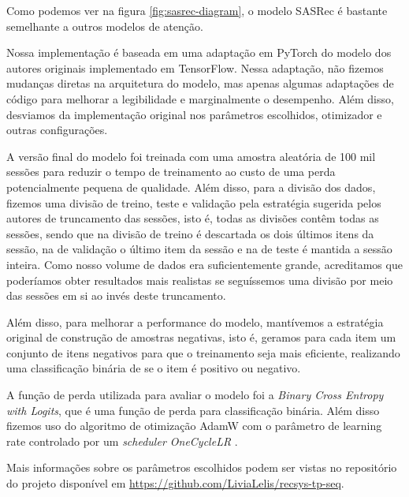 Como podemos ver na figura \ref{fig:sasrec-diagram}, o modelo SASRec
é bastante semelhante a outros modelos de atenção.

Nossa implementação é baseada em uma adaptação \cite{seanswyi} em
PyTorch do modelo dos autores originais implementado em TensorFlow.
Nessa adaptação, não fizemos mudanças diretas na arquitetura do
modelo, mas apenas algumas adaptações de código para melhorar a
legibilidade e marginalmente o desempenho. Além disso, desviamos
da implementação original nos parâmetros escolhidos, otimizador
e outras configurações.

A versão final do modelo foi treinada com uma amostra aleatória
de 100 mil sessões para reduzir o tempo de treinamento ao custo
de uma perda potencialmente pequena de qualidade. Além disso,
para a divisão dos dados, fizemos uma divisão de treino, teste
e validação pela estratégia sugerida pelos autores de truncamento
das sessões, isto é, todas as divisões contêm todas as sessões,
sendo que na divisão de treino é descartada os dois últimos itens
da sessão, na de validação o último item da sessão e na de teste
é mantida a sessão inteira. Como nosso volume de dados era
suficientemente grande, acreditamos que poderíamos obter resultados
mais realistas se seguíssemos uma divisão por meio das sessões em
si ao invés deste truncamento.

Além disso, para melhorar a performance do modelo, mantívemos a
estratégia original de construção de amostras negativas, isto é,
geramos para cada item um conjunto de itens negativos para que o
treinamento seja mais eficiente, realizando uma classificação
binária de se o item é positivo ou negativo.

A função de perda utilizada para avaliar o modelo foi a 
\textit{Binary Cross Entropy with Logits}, que é uma função de perda
para classificação binária. Além disso fizemos uso do algoritmo
de otimização AdamW \cite{adamw} com o parâmetro de learning rate
controlado por um \textit{scheduler OneCycleLR} \cite{onecyclelr}.

Mais informações sobre os parâmetros escolhidos podem ser vistas
no repositório do projeto disponível em \url{https://github.com/LiviaLelis/recsys-tp-seq}.

